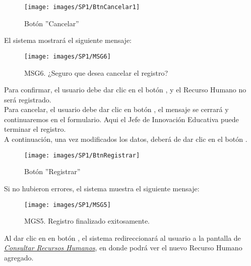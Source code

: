         \begin{figure}[!hbtp]
            \centering
            \hypertarget{cancel1}{\texttt{[image: images/SP1/BtnCancelar1]}}
            \caption{Botón ''Cancelar''}
            \label{cancel1}
        \end{figure}

        El sistema mostrará el siguiente mensaje:
        \begin{figure}[!hbtp]
                \centering
                \hypertarget{buscar}{\texttt{[image: images/SP1/MSG6]}}
                \caption{MSG6. ¿Seguro que desea cancelar el registro?}
                \label{buscar}
        \end{figure}

        Para confirmar, el usuario debe dar clic en el botón , y el Recurso Humano no será registrado.\\

        Para cancelar, el usuario debe dar clic en botón , el mensaje se cerrará y continuaremos en el formulario. Aqui el Jefe de Innovación Educativa puede terminar el registro.\\

        A continuación, una vez modificados los datos, deberá de dar clic en el botón .
        \begin{figure}[!hbtp]
            \centering
            \hypertarget{btnreg}{\texttt{[image: images/SP1/BtnRegistrar]}}
            \caption{Botón ''Registrar''}
            \label{btnreg}
        \end{figure}

        Si no hubieron errores, el sistema muestra el siguiente mensaje:
        \newpage
        \begin{figure}[!hbtp]
                \centering
                \hypertarget{buscar}{\texttt{[image: images/SP1/MSG5]}}
                \caption{MGS5. Registro finalizado exitosamente.}
                \label{buscar}
        \end{figure}

        Al dar clic en en botón , el sistema redireccionará al usuario a la pantalla de \hyperlink{consultarrh}{\textit{Consultar Recursos Humanos}}, en donde podrá ver el nuevo Recurso Humano agregado.\\

